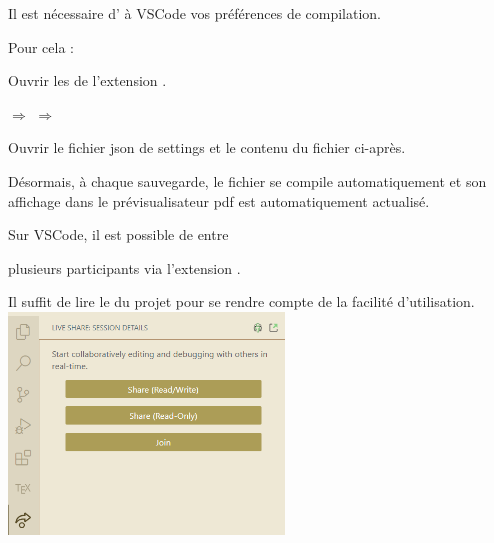 \begin{None}
\begin{tcbenumerate}[2]
        \begin{Remarque}

            Il est nécessaire d' à VSCode vos préférences de compilation. 

            Pour cela : 

            \begin{tcbenumerate}[1][1][alph]
                \tcbitem Ouvrir les  de l'extension . 

                 $\Longrightarrow$  $\Longrightarrow$  

                \tcbitem Ouvrir le fichier json de settings et  le contenu du fichier ci-après. 

                \tcbitem Désormais, à chaque sauvegarde, le fichier se compile automatiquement et son affichage dans le prévisualisateur pdf est automatiquement actualisé. 
            \end{tcbenumerate}

        \end{Remarque}
        \tcbitem[raster multicolumn=2]  Sur VSCode, il est possible de  entre 
        
        \begin{MultiColonnes}{3}
                \tcbitem[raster multicolumn=2] plusieurs participants via l'extension .
                
                Il suffit de lire le  du projet pour se rendre compte de la facilité d'utilisation.
                \tcbitem[halign=center] \includegraphics[width=0.55\textwidth]{images/IDE/live_share_snippet.png}
            \end{MultiColonnes}
    \end{tcbenumerate}
\end{None}


